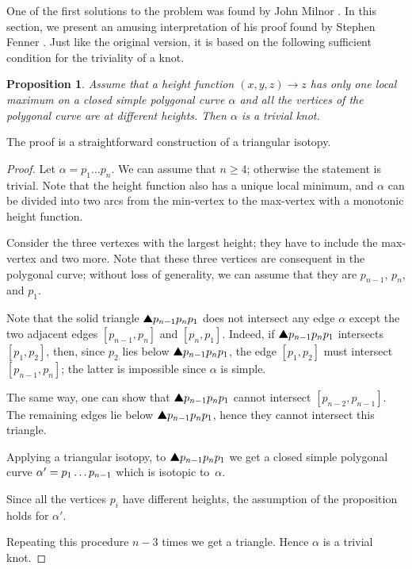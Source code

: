 \documentclass{article}
\newcommand*{\z}[1]{#1\nobreak\discretionary{}%
            {\hbox{$\mathsurround=0pt #1$}}{}}
\theoremstyle{theorem}
\newtheorem{Proposition}[theorem]{Proposition}
\newtheorem{Crofton-type formula}[theorem]{Crofton-type formula}
\newtheorem{Douglas--Rado theorem}[theorem]{Douglas--Rado theorem}
\newtheorem{Extended monotonicity theorem}[theorem]{Extended monotonicity theorem}
\theoremstyle{definition}
\def\solidtriangle{\text{\ding{115}}}
\def\ge{\geqslant}
\begin{document}
One of the first solutions to the problem was found by John Milnor \cite{milnor}.
In this section, we present an amusing interpretation of his proof found by Stephen Fenner \cite{ferner}.
Just like the original version, it is based on the following sufficient condition for the triviality of a knot.

\begin{Proposition}\label{prop:one-max-one-min}
Assume that a height function $(x,y,z)\to z$ 
has only one local maximum on a closed simple polygonal curve $\alpha$ and all the vertices of the polygonal curve are at different heights.
Then $\alpha$ is a trivial knot.
\end{Proposition}

The proof is a straightforward construction of a triangular isotopy. 

\begin{proof}
Let $\alpha=p_1\dots p_n$.
We can assume that $n\ge 4$; otherwise the statement is trivial.
Note that the height function also has a unique local minimum, and $\alpha$ can be divided into two arcs from the min-vertex to the max-vertex with a monotonic height function.

Consider the three vertexes with the largest height;
they have to include the max-vertex and two more.
Note that these three vertices are consequent in the polygonal curve; 
without loss of generality, we can assume that they are $p_{n-1}$, $p_n$, and $p_1$.

Note that the solid triangle $\solidtriangle p_{n-1}p_np_1$ does not intersect any edge $\alpha$ except the two adjacent edges $[p_{n-1},p_n]$ and $[p_n,p_1]$.
Indeed, if $\solidtriangle p_{n-1}p_np_1$ intersects $[p_1,p_2]$,
then, 
since $p_2$ lies below $\solidtriangle p_{n-1}p_np_1$,
the edge $[p_1,p_2]$ must intersect $[p_{n-1},p_n]$;
the latter is impossible since $\alpha$ is simple.

The same way, one can show that $\solidtriangle p_{n-1}p_np_1$ cannot intersect $[p_{n-2},p_{n-1}]$.
The remaining edges lie below $\solidtriangle p_{n-1}p_np_1$, hence they cannot intersect this triangle.

Applying a triangular isotopy, to $\solidtriangle p_{n-1}p_np_1$ we get a closed simple polygonal curve $\alpha'\z=p_1\dots p_{n-1}$ which is isotopic to~$\alpha$.

Since all the vertices $p_i$ have different heights,
the assumption of the proposition holds for $\alpha'$.

Repeating this procedure $n-3$ times we get a triangle.
Hence $\alpha$ is a trivial knot.
\end{proof}
\end{document}
